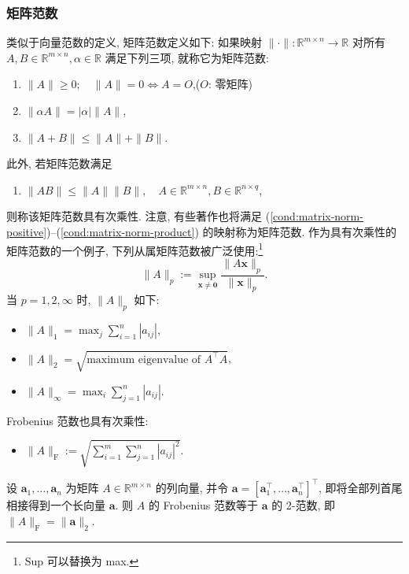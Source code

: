\subsubsection{{矩阵范数}}\label{subsec:matrix-norm}
{类似于向量范数的定义, 矩阵范数定义如下: 如果映射 $\|\cdot\|:\mathbb R^{m\times n}\to\mathbb R$ 对所有 $A,B\in\mathbb R^{m\times n},\alpha\in\mathbb R$ 满足下列三项, 就称它为矩阵范数:}
\begin{enumerate}[label=(Nm\arabic*),ref=Nm\arabic*]
\item\label{cond:matrix-norm-positive} $\|A\|\ge0;\quad\|A\|=0\iff A=O$,\quad ($O$: {零矩阵})
\item\label{cond:matrix-norm-homogeneous} $\|\alpha A\|=|\alpha|\|A\|$,
\item\label{cond:matrix-norm-triangle} $\|A+B\|\le\|A\|+\|B\|$.
\end{enumerate}
{此外, 若矩阵范数满足}
\begin{enumerate}[label=(Nm\arabic*),ref=Nm\arabic*,start=4]
\item\label{cond:matrix-norm-product} $\|AB\|\le\|A\|\|B\|,\quad A\in\mathbb R^{m\times n},B\in\mathbb R^{n\times q}$,
\end{enumerate}
{则称该矩阵范数具有次乘性. 注意, 有些著作也将满足 (\ref{cond:matrix-norm-positive})--(\ref{cond:matrix-norm-product}) 的映射称为矩阵范数. 作为具有次乘性的矩阵范数的一个例子, 下列从属矩阵范数被广泛使用:\footnote{Sup 可以替换为 max.}}
\begin{equation}\label{eq:subordinate-matrix-norm}
\|A\|_p:=\sup_{\bm x\ne\bm0}\frac{\|A\bm x\|_p}{\|\bm x\|_p}.
\end{equation}
{当 $p=1,2,\infty$ 时, $\|A\|_p$ 如下:}
\begin{itemize}
\item $\|A\|_1=\max_j\sum_{i=1}^n|a_{ij}|$,
\item $\|A\|_2=\sqrt{\text{maximum eigenvalue of }A^\top A}$,
\item $\|A\|_\infty=\max_i\sum_{j=1}^n|a_{ij}|$.
\end{itemize}
{Frobenius 范数也具有次乘性:}
\begin{itemize}\item $\|A\|_{\mathrm F}:=\sqrt{\sum_{i=1}^m\sum_{j=1}^n|a_{ij}|^2}$.\end{itemize}
{设 $\bm a_1,\ldots,\bm a_n$ 为矩阵 $A\in\mathbb R^{m\times n}$ 的列向量, 并令 $\bm a=[\bm a_1^\top,\ldots,\bm a_n^\top]^\top$, 即将全部列首尾相接得到一个长向量 $\bm a$. 则 $A$ 的 Frobenius 范数等于 $\bm a$ 的 2-范数, 即 $\|A\|_{\mathrm F}=\|\bm a\|_2$.}

